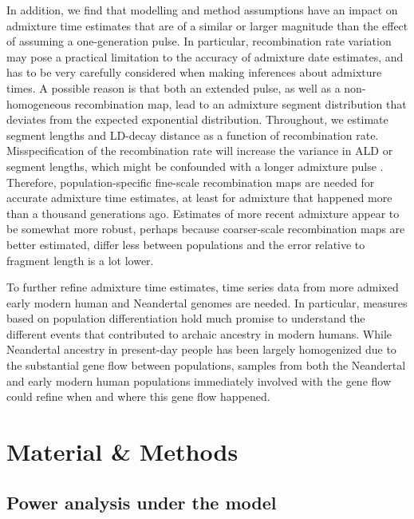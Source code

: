 \documentclass[11pt]{article}
\begin{document}
In addition, we find that modelling and method assumptions have an impact on admixture time estimates that are of a similar or larger magnitude than the effect of assuming a one-generation pulse. In particular, recombination rate variation may pose a practical limitation to the accuracy of admixture date estimates, and has to be very carefully considered when making inferences about admixture times. A possible reason is that both an extended pulse, as well as a non-homogeneous recombination map, lead to an admixture segment distribution that deviates from the expected exponential distribution. Throughout, we estimate segment lengths and LD-decay distance as a function of recombination rate. Misspecification of the recombination rate will increase the variance in ALD or segment lengths, which might be confounded with a longer admixture pulse \citep{sankararaman_date_2012}. Therefore, population-specific fine-scale recombination maps are needed for accurate admixture time estimates, at least for admixture that happened more than a thousand generations ago. Estimates of more recent admixture appear to be somewhat more robust, perhaps because coarser-scale recombination maps are better estimated, differ less between populations \citep{hinch_landscape_2011} and the error relative to fragment length is a lot lower. 

To further refine admixture time estimates, time series data from more admixed early modern human and Neandertal genomes are needed. In particular, measures based on population differentiation  \citep[e.g][]{wall_higher_2013,browning_analysis_2018,villanea_multiple_2019} hold much promise to understand the different events that contributed to archaic ancestry in modern humans. While Neandertal ancestry in present-day people has been largely homogenized due to the substantial gene flow between populations, samples from both the Neandertal and early modern human populations immediately involved with the gene flow could refine when and where this gene flow happened. 


\section{Material \& Methods}\label{methods}

\subsection{Power analysis under the model}\label{power analysis}
\end{document}
